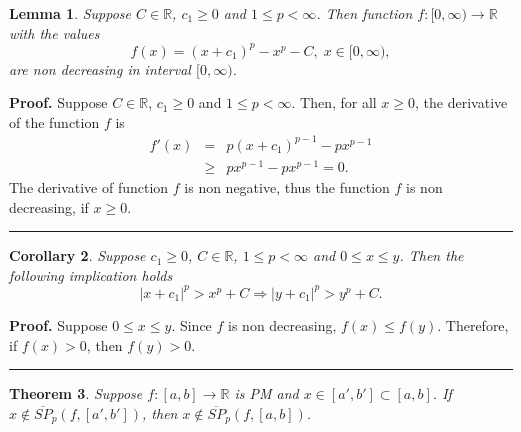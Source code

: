 \documentclass[12pt, a4paper]{article}
\newtheorem{theorem}{Theorem}[section]
\newtheorem{lemma}[theorem]{Lemma}
\newtheorem{corollary}[theorem]{Corollary}
\newenvironment{proof}[1][Proof]{\noindent \textbf{#1.} }{\  \rule{0.5em}{0.5em}}
\numberwithin{equation}{section}
\begin{document}
\begin{lemma}\label{prop:Sp_Monoton}
  Suppose $C \in \mathbb{R}$, 
  $c_1\geq0$ and $1\leq p<\infty$. 
  Then function
  $f:[0,\infty) \rightarrow \mathbb{R}$ with the values
  \begin{equation}
  f(x) = ( x + c_1  )^p - x^p - C,\;x \in [0,\infty),  
  \end{equation}
  are non decreasing in interval $[0,\infty)$. 
\end{lemma}
\begin{proof}
  Suppose $C \in \mathbb{R}$, $c_1\geq0$ and $1\leq p<\infty$. 
  Then, for all $x \geq 0$, the derivative of the function $f$ is
  \begin{eqnarray*} 
    f'(x)   &=& p(x+c_1)^{p-1} - px^{p-1} \\
          &\geq& px^{p-1} - px^{p-1} = 0.
  \end{eqnarray*}  
  The derivative of function $f$ is non negative, 
  thus the function $f$ is non decreasing, if $x \geq 0$.
\end{proof}
\begin{corollary}\label{cor:convex}
  Suppose $c_1\geq0$, $C \in \mathbb{R}$, $1\leq p<\infty$ 
  and $0 \leq x \leq y$. 
  Then the following implication holds 
  \begin{equation}
  |x + c_1 |^p > x^p + C \Rightarrow |y + c_1 |^{p} > y^{p} + C.  
  \end{equation}
\end{corollary}
\begin{proof}
  Suppose  $0 \leq x \leq y$. 
  Since $f$ is non decreasing, $f(x) \leq f(y)$.
  Therefore, if $f(x)>0$, then $f(y)>0$.
\end{proof}


\begin{theorem}\label{th:notinST} 
  Suppose $f:[a,b] \rightarrow \mathbb{R}$ is PM and
  $x \in [a', b'] \subset [a,b]$.    
  If $x \notin \overline{SP}_p(f, [a', b'])$, then 
  $x \notin \overline{SP}_p(f, [a, b])$. 
\end{theorem}
\end{document}
